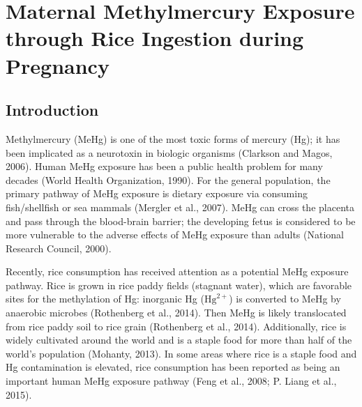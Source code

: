 \chapter{Maternal Methylmercury Exposure through Rice Ingestion during Pregnancy}

\section{Introduction}

Methylmercury (MeHg) is one of the most toxic forms of mercury (Hg); it has been implicated as a neurotoxin in biologic organisms (Clarkson and Magos, 2006). Human MeHg exposure has been a public health problem for many decades (World Health Organization, 1990). For the general population, the primary pathway of MeHg exposure is dietary exposure via consuming fish/shellfish or sea mammals (Mergler et al., 2007). MeHg can cross the placenta and pass through the blood-brain barrier; the developing fetus is considered to be more vulnerable to the adverse effects of MeHg exposure than adults (National Research Council, 2000).

Recently, rice consumption has received attention as a potential MeHg exposure pathway. Rice is grown in rice paddy fields (stagnant water), which are favorable sites for the methylation of Hg: inorganic Hg (\(\text{Hg}^{2+}\)) is converted to MeHg by anaerobic microbes (Rothenberg et al., 2014). Then MeHg is likely translocated from rice paddy soil to rice grain (Rothenberg et al., 2014). Additionally, rice is widely cultivated around the world and is a staple food for more than half of the world's population (Mohanty, 2013). In some areas where rice is a staple food and Hg contamination is elevated, rice consumption has been reported as being an important human MeHg exposure pathway (Feng et al., 2008; P. Liang et al., 2015). 

